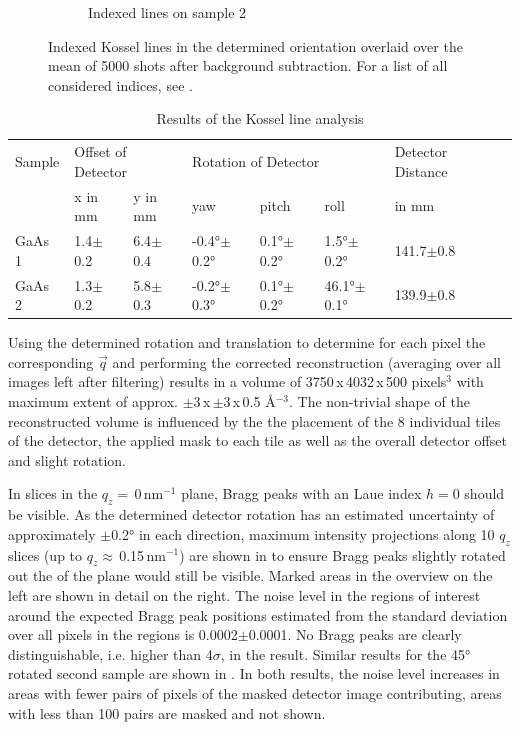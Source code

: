 \begin{figure}
\begin{subfigure}{0.35\textwidth}
		\caption{Indexed lines on sample 2}
	\end{subfigure}
	\caption[Kossel lines on GaAs samples]{Indexed Kossel lines in the determined orientation overlaid over the mean of 5000 shots after background subtraction. For a list of all considered indices, see  .}
	\label{fig:kosselgaaslines}
\end{figure}

\begin{table}[]
	\caption{Results of the Kossel line analysis}
	\begin{small}
		\begin{tabular}{llllllll}
			\hline
			Sample & \multicolumn{2}{l}{Offset of Detector} & \multicolumn{3}{l}{Rotation of Detector}  & Detector Distance &  \\
			& x in mm        & y in mm        & yaw              & pitch           & roll           & in mm             &  \\ 
			\hline
			GaAs 1 & 1.4$\pm$0.2    & 6.4$\pm$0.4    & -0.4°$\pm$0.2° & 0.1°$\pm$0.2° & 1.5°$\pm$0.2° & 141.7$\pm$0.8     &  \\
			GaAs 2 & 1.3$\pm$0.2    & 5.8$\pm$0.3    & -0.2°$\pm$0.3° & 0.1°$\pm$0.2° & 46.1°$\pm$0.1° & 139.9$\pm$0.8     &  \\
			\hline
		\end{tabular}
	\end{small}	
	\label{tab:kosselfit}
\end{table}

Using the determined rotation and translation to determine for each pixel the corresponding $\vec{q}$ and performing the corrected reconstruction (averaging over all images left after filtering) results in a volume of 3750\,x\,4032\,x\,500 pixels$^3$ with maximum extent of approx. $\pm$3\,x\,$\pm$3\,x\,0.5 \AA$^{-3}$. The non-trivial shape of the reconstructed volume is influenced by the the placement of the 8 individual tiles of the detector, the applied mask to each tile as well as the overall detector offset and slight rotation.

 In slices in the $q_z=$\,0\,nm$^{-1}$ plane, Bragg peaks with an Laue index $h=0$ should be visible. As the determined detector rotation has an estimated uncertainty of approximately $\pm$0.2° in each direction, maximum intensity projections along 10 $q_z$ slices (up to $q_z\approx$\,0.15\,nm$^{-1}$) are shown in  to ensure Bragg peaks slightly rotated out the of the plane would still be visible. Marked areas in the overview on the left are shown in detail on the right. The noise level in the regions of interest around the expected Bragg peak positions estimated from the standard deviation over all pixels in the regions is 0.0002$\pm$0.0001.  No Bragg peaks are clearly distinguishable, i.e. higher than 4$\sigma$,  in the result. Similar results for the 45° rotated second sample are shown in . In both results, the noise level increases in areas with fewer pairs of pixels of the masked detector image contributing, areas with less than 100 pairs are masked and not shown.
 
